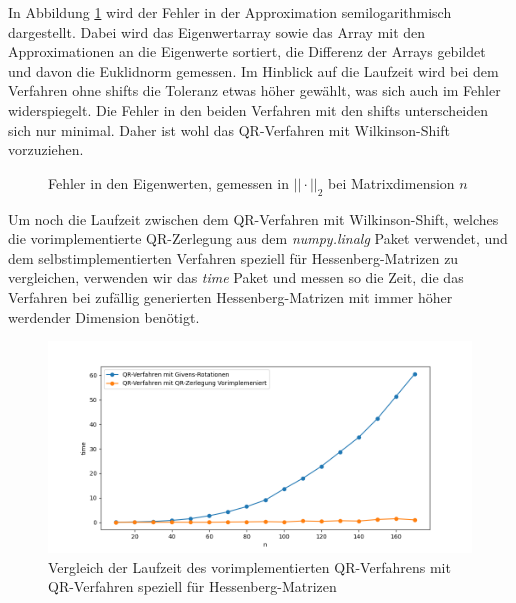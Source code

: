 \documentclass{article}
\theoremstyle{plain}
\begin{document}
In Abbildung \ref{Error_QR} wird der Fehler in der Approximation semilogarithmisch dargestellt. Dabei wird das Eigenwertarray sowie das Array mit den Approximationen an die Eigenwerte sortiert, die Differenz der Arrays gebildet und davon die Euklidnorm gemessen. Im Hinblick auf die Laufzeit wird bei dem Verfahren ohne shifts die Toleranz etwas höher gewählt, was sich auch im Fehler widerspiegelt. Die Fehler in den beiden Verfahren mit den shifts unterscheiden sich nur minimal. Daher ist wohl das QR-Verfahren mit Wilkinson-Shift vorzuziehen.


\begin{figure}[H]
  \centering
  \qquad
  \caption{Fehler in den Eigenwerten, gemessen in $||\cdot||_2$ bei Matrixdimension $n$}%
  \label{Error_QR}
\end{figure}

Um noch die Laufzeit zwischen dem QR-Verfahren mit Wilkinson-Shift, welches die vorimplementierte QR-Zerlegung aus dem \textit{numpy.linalg} Paket verwendet, und dem selbstimplementierten Verfahren speziell für Hessenberg-Matrizen zu vergleichen, verwenden wir das \textit{time} Paket und messen so die Zeit, die das Verfahren bei zufällig generierten Hessenberg-Matrizen mit immer höher werdender Dimension benötigt.

\begin{figure}[H]
	\centering
	\includegraphics[width = 0.6\linewidth]{Plots/Laufzeitvergleich}
	\caption{Vergleich der Laufzeit des vorimplementierten QR-Verfahrens mit QR-Verfahren speziell für Hessenberg-Matrizen}
	\label{Laufzeitvergleich}
\end{figure}
\end{document}
